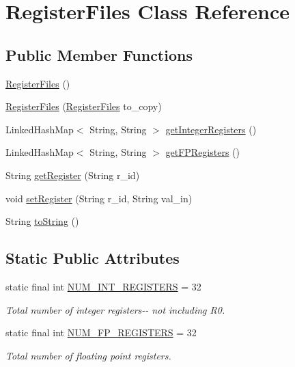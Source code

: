 \hypertarget{classRegisterFiles}{\section{\-Register\-Files \-Class \-Reference}
\label{classRegisterFiles}
}
\subsection*{\-Public \-Member \-Functions}
\begin{DoxyCompactItemize}
\item 
\hyperlink{classRegisterFiles_aef4ab4cab2d2cc79b9cbf651853f5349}{\-Register\-Files} ()
\item 
\hyperlink{classRegisterFiles_a2aae18c5c9abcb311e8a425ab7215000}{\-Register\-Files} (\hyperlink{classRegisterFiles}{\-Register\-Files} to\-\_\-copy)
\item 
\-Linked\-Hash\-Map$<$ \-String, \-String $>$ \hyperlink{classRegisterFiles_ab31583ee423d1f4b1aad3a492df67115}{get\-Integer\-Registers} ()
\item 
\-Linked\-Hash\-Map$<$ \-String, \-String $>$ \hyperlink{classRegisterFiles_a6eb4fef34372e6de81e9611c0ef6afd7}{get\-F\-P\-Registers} ()
\item 
\-String \hyperlink{classRegisterFiles_aa31a4ef3fd261434e788bd0b5c7e5c71}{get\-Register} (\-String r\-\_\-id)
\item 
void \hyperlink{classRegisterFiles_a8c750398bebe4a19b9d7db61f8affe69}{set\-Register} (\-String r\-\_\-id, \-String val\-\_\-in)
\item 
\-String \hyperlink{classRegisterFiles_a72d8f3fe46917e2a365cbc255bfc4dc2}{to\-String} ()
\end{DoxyCompactItemize}
\subsection*{\-Static \-Public \-Attributes}
\begin{DoxyCompactItemize}
\item 
static final int \hyperlink{classRegisterFiles_acddf439e364d3aae0d80304b9a48cddc}{\-N\-U\-M\-\_\-\-I\-N\-T\-\_\-\-R\-E\-G\-I\-S\-T\-E\-R\-S} = 32
\begin{DoxyCompactList}\small\item\em \-Total number of integer registers-\/-\/ not including \-R0. \end{DoxyCompactList}\item 
static final int \hyperlink{classRegisterFiles_aa00e6ad5b82f53a4b9afd7187f3a4245}{\-N\-U\-M\-\_\-\-F\-P\-\_\-\-R\-E\-G\-I\-S\-T\-E\-R\-S} = 32
\begin{DoxyCompactList}\small\item\em \-Total number of floating point registers. \end{DoxyCompactList}\end{DoxyCompactItemize}
